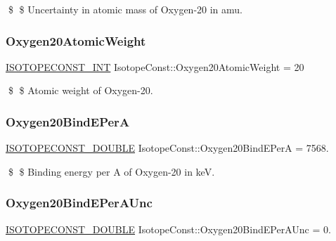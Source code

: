 \$ \$ Uncertainty in atomic mass of Oxygen-\/20 in amu. \mbox{\label{group___isotope_const-_oxygen-_o20_ga3783e052f032bbea52b77c5fa6dd5348}} 
\subsubsection{\texorpdfstring{Oxygen20\+Atomic\+Weight}{Oxygen20AtomicWeight}}
{\footnotesize\ttfamily \mbox{\hyperlink{group___isotope_const-_macros_ga5f18360b3e99483a35c32d789e62621c}{I\+S\+O\+T\+O\+P\+E\+C\+O\+N\+S\+T\+\_\+\+I\+NT}} Isotope\+Const\+::\+Oxygen20\+Atomic\+Weight = 20}

\$ \$ Atomic weight of Oxygen-\/20. \mbox{\label{group___isotope_const-_oxygen-_o20_ga63062b0147d2b07264ed2e6606bef39b}} 
\subsubsection{\texorpdfstring{Oxygen20\+Bind\+E\+PerA}{Oxygen20BindEPerA}}
{\footnotesize\ttfamily \mbox{\hyperlink{group___isotope_const-_macros_ga8f45a7272ce02c0b4c65c44636ed719a}{I\+S\+O\+T\+O\+P\+E\+C\+O\+N\+S\+T\+\_\+\+D\+O\+U\+B\+LE}} Isotope\+Const\+::\+Oxygen20\+Bind\+E\+PerA = 7568.}

\$ \$ Binding energy per A of Oxygen-\/20 in keV. \mbox{\label{group___isotope_const-_oxygen-_o20_gad574ef4e15af348c495ac76dc70d9145}} 
\subsubsection{\texorpdfstring{Oxygen20\+Bind\+E\+Per\+A\+Unc}{Oxygen20BindEPerAUnc}}
{\footnotesize\ttfamily \mbox{\hyperlink{group___isotope_const-_macros_ga8f45a7272ce02c0b4c65c44636ed719a}{I\+S\+O\+T\+O\+P\+E\+C\+O\+N\+S\+T\+\_\+\+D\+O\+U\+B\+LE}} Isotope\+Const\+::\+Oxygen20\+Bind\+E\+Per\+A\+Unc = 0.}

